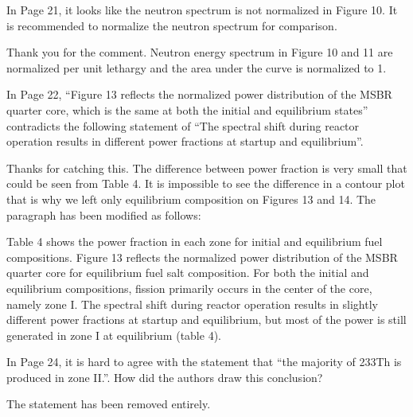 \documentclass[answers,11pt]{exam}
\begin{document}
\begin{questions}
        \question  In Page 21, it looks like the neutron spectrum is not 
        normalized in Figure 10. It is recommended to normalize the neutron 
        spectrum for comparison.
        \begin{solution}
                Thank you for the comment. Neutron energy spectrum in Figure 
                10 and 11 are normalized per unit lethargy and the area under 
                the curve is normalized to 1.
        \end{solution}

        \question  In Page 22, ``Figure 13 reflects the normalized power 
        distribution of the MSBR quarter core, which is the same at both the 
        initial and equilibrium states'' contradicts the following statement of 
        ``The spectral shift during reactor operation results in different power 
        fractions at startup and equilibrium''.
        \begin{solution}
                Thanks for catching this. The difference between power fraction
                 is very small that could be seen from Table 4. It is impossible
                  to see the difference in a contour plot that is why we left only 
                 equilibrium composition on Figures 13 and 14. The paragraph has 
                 been modified as follows:
                 
                 Table 4 shows the power fraction in each zone for initial and 
                 equilibrium fuel compositions. Figure 13 reflects the normalized 
                 power distribution of the MSBR quarter core for equilibrium 
                 fuel salt composition. For both the initial and equilibrium 
                 compositions, fission primarily occurs in the center of the core, 
                 namely zone I. The spectral shift during reactor operation results 
                 in slightly different power fractions at startup and equilibrium, 
                 but most of the power is still generated in zone I at equilibrium 
				 (table 4).                  
                   
        \end{solution}

        \question  In Page 24, it is hard to agree with the statement that ``the 
        majority of 233Th is produced in zone II.''. How did the authors draw 
        this conclusion?
        \begin{solution}
                The statement has been removed entirely.
        \end{solution}


\end{questions}
\end{document}
